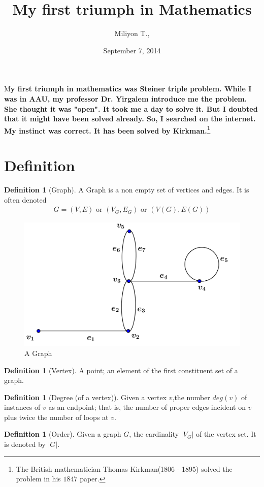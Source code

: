 \documentclass[	DIV=calc,%
							paper=a4,%
							fontsize=11pt,%
							twocolumn]{scrartcl}	 					%
\title{My first triumph in Mathematics}					%
\author{Miliyon T., }											%
\date{September 7, 2014}																				%
\theoremstyle{definition}
\newtheorem{defn}[thm]{Definition}
\theoremstyle{plain}
\theoremstyle{remark}
\newcommand{\initial}[1]{%
     \lettrine[lines=3,lhang=0.3,nindent=0em]{
     				\color{DarkGoldenrod}
     				{\textsf{#1}}}{}}
\begin{document}
\maketitle
\thispagestyle{fancy} 			%
\initial{M}\textbf{y first triumph in mathematics was Steiner triple problem. While I was in AAU, my professor Dr. Yirgalem introduce me the problem. She thought it was "open". It took me a day to solve it. But I doubted that it might have been solved already. So, I searched on the internet. My instinct was correct. It has been solved by Kirkman.\footnote{The British mathematician Thomas Kirkman(1806 - 1895) solved the problem in his $1847$ paper.}}

\section{Definition}
\begin{defn}[Graph] A Graph is a non empty set of vertices and edges. It is often denoted
\begin{align*}
G=(V,E) \text{ or } (V_G,E_G) \text{ or } (V(G),E(G))
\end{align*}
\end{defn}

\begin{figure}[hbt!]
\centering
\includegraphics[width=.4\textwidth]{graph.png}
\caption{A Graph}\label{fig1}
\end{figure}

\begin{defn}[Vertex]
A point; an element of the first constituent set of a graph.
\end{defn}
\begin{defn}[Degree (of a vertex)]
Given a vertex $v$,the number $deg(v)$ of instances of $v$ as an endpoint; that is, the number of proper edges incident on $v$ plus twice the number of loops at $v$.
\end{defn}

\begin{defn}[Order]
Given a graph $G$, the cardinality $|V_G|$ of the vertex set. It is denoted by $|G|$.
\end{defn}
\end{document}
